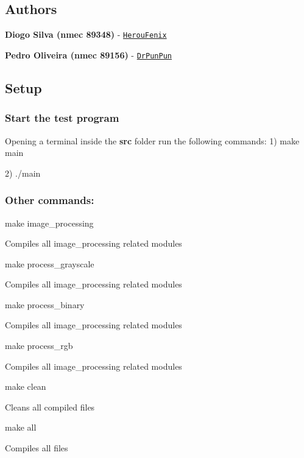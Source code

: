 \subsection*{Authors}


\begin{DoxyItemize}
\item {\bfseries Diogo Silva (nmec 89348)} -\/ \href{https://github.com/HerouFenix}{\tt Herou\+Fenix}
\item {\bfseries Pedro Oliveira (nmec 89156)} -\/ \href{https://github.com/DrPunPun}{\tt Dr\+Pun\+Pun}
\end{DoxyItemize}

\subsection*{Setup}

\subsubsection*{Start the test program}

Opening a terminal inside the {\bfseries src} folder run the following commands\+: 1) make main

2) ./main

\subsubsection*{Other commands\+:}


\begin{DoxyItemize}
\item make image\+\_\+processing
\begin{DoxyItemize}
\item Compiles all image\+\_\+processing related modules
\end{DoxyItemize}
\item make process\+\_\+grayscale
\begin{DoxyItemize}
\item Compiles all image\+\_\+processing related modules
\end{DoxyItemize}
\item make process\+\_\+binary
\begin{DoxyItemize}
\item Compiles all image\+\_\+processing related modules
\end{DoxyItemize}
\item make process\+\_\+rgb
\begin{DoxyItemize}
\item Compiles all image\+\_\+processing related modules
\end{DoxyItemize}
\item make clean
\begin{DoxyItemize}
\item Cleans all compiled files
\end{DoxyItemize}
\item make all
\begin{DoxyItemize}
\item Compiles all files
\end{DoxyItemize}
\end{DoxyItemize}

